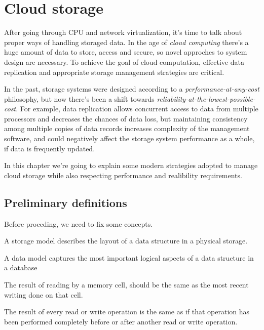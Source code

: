 \chapter{Cloud storage}
After going through CPU and network virtualization, it's time to talk about
proper ways of handling storaged data. In the age of \emph{cloud computing}
there's a huge amount of data to store, access and secure, so novel approches
to system design are necessary. To achieve the goal of cloud computation,
effective data replication and appropriate storage management strategies are
critical.

In the past, storage systems were designed according to a
\emph{performance-at-any-cost} philosophy, but now there's been a shift towards
\emph{reliability-at-the-lowest-possible-cost}. For example, data replication
allows concurrent access to data from multiple processors and decreases the
chances of data loss, but maintaining consistency among multiple copies of data
records increases complexity of the management software, and could negatively
affect the storage system performance as a whole, if data is frequently updated.

In this chapter we're going to explain some modern strategies adopted
to manage cloud storage while also respecting performance and realibility
requirements.

\section{Preliminary definitions}
Before proceding, we need to fix some concepts.

\begin{definition}
    A storage model describes the layout of a data structure in a physical storage.
\end{definition}
\begin{definition}
    A data model captures the most important logical aspects of a data structure
    in a database 
\end{definition}

\begin{definition}
    The result of reading by a memory cell, should be the same as the most recent
    writing done on that cell.
\end{definition}
\begin{definition}
    The result of every read or write operation is the same as if that
    operation has been performed completely before or after another read or
    write operation.
\end{definition}


